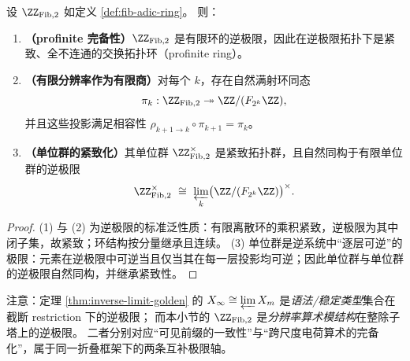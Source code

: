 \begin{proposition}\label{prop:fib-adic-basic}
设 $\ZZ_{\mathrm{Fib},2}$ 如定义 \ref{def:fib-adic-ring}。
则：
\begin{enumerate}
  \item \textbf{（profinite 完备性）}$\ZZ_{\mathrm{Fib},2}$ 是有限环的逆极限，因此在逆极限拓扑下是紧致、全不连通的交换拓扑环（profinite ring）。
  \item \textbf{（有限分辨率作为有限商）}对每个 $k$，存在自然满射环同态
  \[
  \pi_k:\ZZ_{\mathrm{Fib},2}\twoheadrightarrow \ZZ/(F_{2^k}\ZZ),
  \]
  并且这些投影满足相容性 $\rho_{k+1\to k}\circ \pi_{k+1}=\pi_k$。
  \item \textbf{（单位群的紧致化）}其单位群 $\ZZ_{\mathrm{Fib},2}^\times$ 是紧致拓扑群，且自然同构于有限单位群的逆极限
  \[
  \ZZ_{\mathrm{Fib},2}^\times\ \cong\ \varprojlim_k \bigl(\ZZ/(F_{2^k}\ZZ)\bigr)^\times.
  \]
\end{enumerate}
\end{proposition}
\begin{proof}
(1) 与 (2) 为逆极限的标准泛性质：有限离散环的乘积紧致，逆极限为其中闭子集，故紧致；环结构按分量继承且连续。
(3) 单位群是逆系统中“逐层可逆”的极限：元素在逆极限中可逆当且仅当其在每一层投影均可逆；因此单位群与单位群的逆极限自然同构，并继承紧致性。
\end{proof}

\begin{remark}\label{rem:fib-adic-vs-syntax}
注意：定理 \ref{thm:inverse-limit-golden} 的 $X_\infty\cong\varprojlim X_m$ 是\emph{语法/稳定类型}集合在截断 restriction 下的逆极限；
而本小节的 $\ZZ_{\mathrm{Fib},2}$ 是\emph{分辨率算术模结构}在整除子塔上的逆极限。
二者分别对应“可见前缀的一致性”与“跨尺度电荷算术的完备化”，属于同一折叠框架下的两条互补极限轴。
\end{remark}
